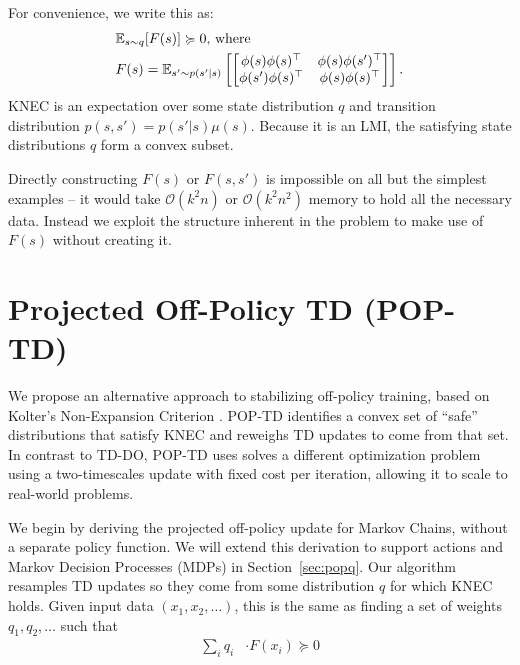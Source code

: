 For convenience, we write this as:
\begin{align}
   & \mathbb{E}_{s\sim q}  [F(s)] \succcurlyeq 0 \text{, where}                            \\
   & F(s) = \mathbb{E}_{s'\sim p(s'|s)}  \left[\begin{bmatrix}
                                           \phi(s)\phi(s)^\top  & \phi(s)\phi(s')^\top \\
                                           \phi(s')\phi(s)^\top & \phi(s)\phi(s)^\top
                                         \end{bmatrix}\right] . \label{eqn:fmatrix}
\end{align}
KNEC is an expectation over some state distribution $q$ and transition distribution $p(s,s') = p(s'|s) \mu(s)$. Because it is an LMI, the satisfying state distributions $q$ form a convex subset.

Directly constructing $F(s)$ or $F(s, s')$ is impossible on all but the simplest examples -- it would take $\mathcal O(k^2n)$ or $\mathcal O(k^2n^2)$ memory to hold all the necessary data. Instead we exploit the structure inherent in the problem to make use of $F(s)$ without creating it.



\section{Projected Off-Policy TD (POP-TD) }

We propose an alternative approach to stabilizing off-policy training, based on Kolter's Non-Expansion Criterion \citep{kolter2011fixed}. POP-TD identifies a convex set of ``safe'' distributions that satisfy KNEC and reweighs TD updates to come from that set. In contrast to TD-DO, POP-TD uses solves a different optimization problem using a two-timescales update with fixed cost per iteration, allowing it to scale to real-world problems.

We begin by deriving the projected off-policy update for Markov Chains, without a separate policy function. We will extend this derivation to support actions and Markov Decision Processes (MDPs) in Section~\ref{sec:popq}. Our algorithm resamples TD updates so they come from some distribution $q$ for which KNEC holds. Given input data $(x_1, x_2, \ldots)$, this is the same as finding a set of weights $q_1, q_2, \ldots$ such that
\begin{align}
  \sum_i q_i & \cdot F(x_i) \succcurlyeq 0
\end{align}


